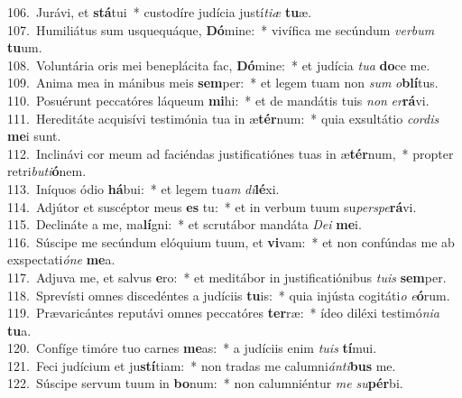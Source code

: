 {106.~}Jurávi, et \textbf{stá}tui~* custodíre judícia justí\textit{ti}\textit{æ} \textbf{tu}æ.\\
{107.~}Humiliátus sum usquequáque, \textbf{Dó}mine:~* vivífica me secúndum \textit{ver}\textit{bum} \textbf{tu}um.\\
{108.~}Voluntária oris mei beneplácita fac, \textbf{Dó}mine:~* et judícia \textit{tu}\textit{a} \textbf{do}ce me.\\
{109.~}Anima mea in mánibus meis \textbf{sem}per:~* et legem tuam non \textit{sum} \textit{o}\textbf{blí}tus.\\
{110.~}Posuérunt peccatóres láqueum \textbf{mi}hi:~* et de mandátis tuis \textit{non} \textit{er}\textbf{rá}vi.\\
{111.~}Hereditáte acquisívi testimónia tua in æ\textbf{tér}num:~* quia exsultátio \textit{cor}\textit{dis} \textbf{me}i sunt.\\
{112.~}Inclinávi cor meum ad faciéndas justificatiónes tuas in æ\textbf{tér}num,~* propter retri\textit{bu}\textit{ti}\textbf{ó}nem.\\
{113.~}Iníquos ódio \textbf{há}bui:~* et legem tu\textit{am} \textit{di}\textbf{lé}xi.\\
{114.~}Adjútor et suscéptor meus \textbf{es} tu:~* et in verbum tuum su\textit{per}\textit{spe}\textbf{rá}vi.\\
{115.~}Declináte a me, ma\textbf{lí}gni:~* et scrutábor mandáta \textit{De}\textit{i} \textbf{me}i.\\
{116.~}Súscipe me secúndum elóquium tuum, et \textbf{vi}vam:~* et non confúndas me ab exspectati\textit{ó}\textit{ne} \textbf{me}a.\\
{117.~}Adjuva me, et salvus \textbf{e}ro:~* et meditábor in justificatiónibus \textit{tu}\textit{is} \textbf{sem}per.\\
{118.~}Sprevísti omnes discedéntes a judíciis \textbf{tu}is:~* quia injústa cogitáti\textit{o} \textit{e}\textbf{ó}rum.\\
{119.~}Prævaricántes reputávi omnes peccatóres \textbf{ter}ræ:~* ídeo diléxi testimó\textit{ni}\textit{a} \textbf{tu}a.\\
{120.~}Confíge timóre tuo carnes \textbf{me}as:~* a judíciis enim \textit{tu}\textit{is} \textbf{tí}mui.\\
{121.~}Feci judícium et ju\textbf{stí}tiam:~* non tradas me calumni\textit{án}\textit{ti}\textbf{bus} me.\\
{122.~}Súscipe servum tuum in \textbf{bo}num:~* non calumniéntur \textit{me} \textit{su}\textbf{pér}bi.\\
